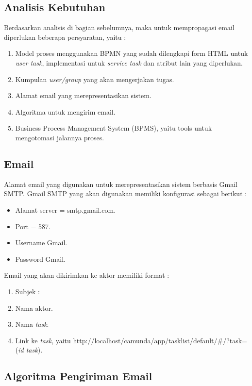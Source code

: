 \subsection{Analisis Kebutuhan}
\label{analisiskebutuhan}
Berdasarkan analisis di bagian sebelumnya, maka untuk mempropagasi email diperlukan beberapa persyaratan, yaitu :
\begin{enumerate}
	\item Model proses menggunakan BPMN yang sudah dilengkapi form HTML untuk \textit{user task}, implementasi untuk \textit{service task} dan atribut lain yang diperlukan.
	\item Kumpulan \textit{user/group} yang akan mengerjakan tugas.
	\item Alamat email yang merepresentasikan sistem.
	\item Algoritma untuk mengirim email.
	\item Business Process Management System (BPMS), yaitu tools untuk mengotomasi jalannya proses.
\end{enumerate}

\subsection{Email}
\label{email}
Alamat email yang digunakan untuk merepresentasikan sistem berbasis Gmail SMTP. Gmail SMTP yang akan digunakan memiliki konfigurasi sebagai berikut \cite{smtpgoogle} :
\begin{itemize}
	\item Alamat server = smtp.gmail.com.
	\item Port = 587.
	\item Username Gmail.
	\item Password Gmail.
\end{itemize}
Email yang akan dikirimkan ke aktor memiliki format :
\begin{enumerate}
	\item Subjek :
	\item Nama aktor.
	\item Nama \textit{task}.
	\item Link ke \textit{task}, yaitu http://localhost/camunda/app/tasklist/default/\#/?task=(\textit{id task}).
\end{enumerate} 

\subsection{Algoritma Pengiriman Email}
\label{sec:algoritma}

